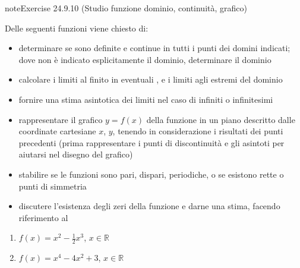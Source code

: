 \documentclass[letterpaper,10pt,italian]{jupyterBook}
\begin{document}
\begin{sphinxadmonition}{note}{Exercise 24.9.10 (Studio funzione \sphinxhyphen{} dominio, continuità, grafico)}





\sphinxAtStartPar
Delle seguenti funzioni viene chiesto di:
\begin{itemize}
\item {} 
\sphinxAtStartPar
determinare se sono definite e continue in tutti i punti dei domini indicati; dove non è indicato esplicitamente il dominio, determinare il dominio

\item {} 
\sphinxAtStartPar
calcolare i limiti al finito in eventuali {\hyperref[\detokenize{ch/infinitesimal_calculus/analysis:infinitesimal-calculus-continuous-fun-disc}]{}}, e i limiti agli estremi del dominio

\item {} 
\sphinxAtStartPar
fornire una stima asintotica dei limiti nel caso di infiniti o infinitesimi

\item {} 
\sphinxAtStartPar
rappresentare il grafico \(y = f(x)\) della funzione in un piano descritto dalle coordinate cartesiane \(x\), \(y\), tenendo in considerazione i risultati dei punti precedenti (prima rappresentare i punti di discontinuità e gli asintoti per aiutarsi nel disegno del grafico)

\item {} 
\sphinxAtStartPar
stabilire se le funzioni sono pari, dispari, periodiche, o se esistono rette o punti di simmetria

\item {} 
\sphinxAtStartPar
discutere l’esistenza degli zeri della funzione e darne una stima, facendo riferimento al {\hyperref[\detokenize{ch/infinitesimal_calculus/analysis:infinitesimal-calculus-continuous-fun-thms-zeros}]{}}

\end{itemize}
\begin{enumerate}
%
\setcounter{enumi}{-1}
\item {} 
\sphinxAtStartPar
\(f(x) = x^2 - \frac{1}{2}x^3\), \(x \in \mathbb{R}\) 

\item {} 
\sphinxAtStartPar
\(f(x) = x^4-4x^2+3\), \(x \in \mathbb{R}\) 


\end{enumerate}
\end{sphinxadmonition}
\end{document}
